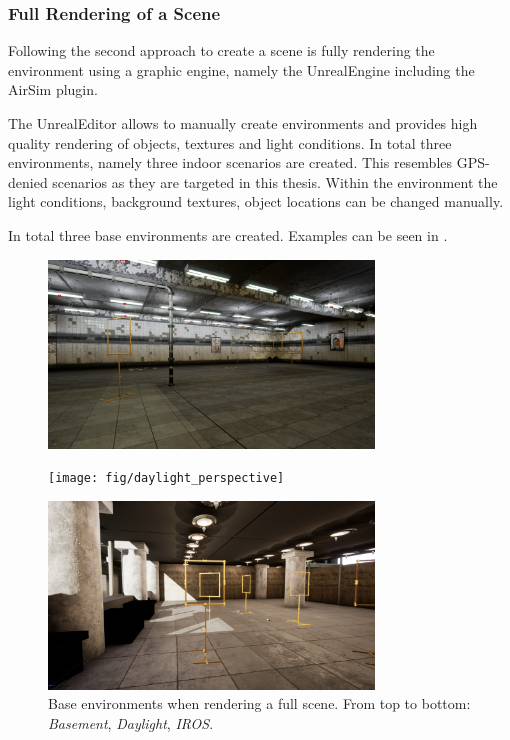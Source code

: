 \subsubsection{Full Rendering of a Scene}

Following \cite{Ros2016, Gaidon2016, Johnson-Roberson2016, Tobin2017, Tremblay2018a} the second approach to create a scene is fully rendering the environment using a graphic engine, namely the UnrealEngine including the AirSim plugin.

The UnrealEditor allows to manually create environments and provides high quality rendering of objects, textures and light conditions. In total three environments, namely three indoor scenarios are created. This resembles GPS-denied scenarios as they are targeted in this thesis. Within the environment the light conditions, background textures, object locations can be changed manually.

In total three base environments are created. Examples can be seen in .

\begin{figure}[hbtp]
	\centering
	\begin{minipage}{\textwidth}
		\includegraphics[width=\textwidth,height=5cm]{fig/basement_perspective}
	\end{minipage}


\begin{minipage}{\textwidth}
	\texttt{[image: fig/daylight\_perspective]}
\end{minipage}


\begin{minipage}{\textwidth}
	\includegraphics[width=\textwidth,height=5cm]{fig/iros_perspective}
\end{minipage}
\caption{Base environments when rendering a full scene. From top to bottom: \textit{Basement}, \textit{Daylight}, \textit{IROS}.}
\label{fig:environments}
\end{figure}

